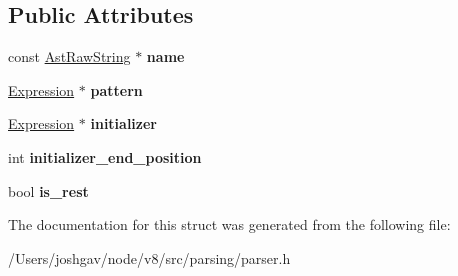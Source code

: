 \subsection*{Public Attributes}
\begin{DoxyCompactItemize}
\item 
const \hyperlink{classv8_1_1internal_1_1_ast_raw_string}{Ast\+Raw\+String} $\ast$ {\bfseries name}\hypertarget{structv8_1_1internal_1_1_parser_formal_parameters_1_1_parameter_a4542eee131539b3094d7cad38caadf9f}{}\label{structv8_1_1internal_1_1_parser_formal_parameters_1_1_parameter_a4542eee131539b3094d7cad38caadf9f}

\item 
\hyperlink{classv8_1_1internal_1_1_expression}{Expression} $\ast$ {\bfseries pattern}\hypertarget{structv8_1_1internal_1_1_parser_formal_parameters_1_1_parameter_ab85c3c02df00b3d6a0ca3ee470fe7707}{}\label{structv8_1_1internal_1_1_parser_formal_parameters_1_1_parameter_ab85c3c02df00b3d6a0ca3ee470fe7707}

\item 
\hyperlink{classv8_1_1internal_1_1_expression}{Expression} $\ast$ {\bfseries initializer}\hypertarget{structv8_1_1internal_1_1_parser_formal_parameters_1_1_parameter_a1ca61a105c415e7bd41319f8cbd666f3}{}\label{structv8_1_1internal_1_1_parser_formal_parameters_1_1_parameter_a1ca61a105c415e7bd41319f8cbd666f3}

\item 
int {\bfseries initializer\+\_\+end\+\_\+position}\hypertarget{structv8_1_1internal_1_1_parser_formal_parameters_1_1_parameter_acba18a85e07618372f8f3e165157e8a8}{}\label{structv8_1_1internal_1_1_parser_formal_parameters_1_1_parameter_acba18a85e07618372f8f3e165157e8a8}

\item 
bool {\bfseries is\+\_\+rest}\hypertarget{structv8_1_1internal_1_1_parser_formal_parameters_1_1_parameter_a498484f8c6cc5cf6e5d835b89afa3368}{}\label{structv8_1_1internal_1_1_parser_formal_parameters_1_1_parameter_a498484f8c6cc5cf6e5d835b89afa3368}

\end{DoxyCompactItemize}


The documentation for this struct was generated from the following file\+:\begin{DoxyCompactItemize}
\item 
/\+Users/joshgav/node/v8/src/parsing/parser.\+h\end{DoxyCompactItemize}
